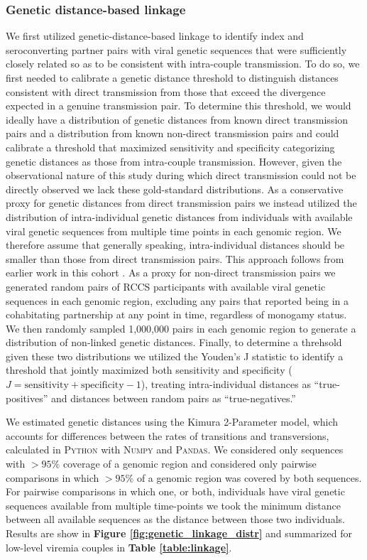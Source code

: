\documentclass{article}[11pt]
\begin{document}
\subsubsection*{Genetic distance-based linkage}
We first utilized genetic-distance-based linkage to identify index and seroconverting partner pairs with viral genetic sequences that were sufficiently closely related so as to be consistent with intra-couple transmission. To do so, we first needed to calibrate a genetic distance threshold to distinguish distances consistent with direct transmission from those that exceed the divergence expected in a genuine transmission pair. To determine this threshold, we would ideally have a distribution of genetic distances from known direct transmission pairs and a distribution from known non-direct transmission pairs and could calibrate a threshold that maximized sensitivity and specificity categorizing genetic distances as those from intra-couple transmission. However, given the observational nature of this study during which direct transmission could not be directly observed we lack these gold-standard distributions. As a conservative proxy for genetic distances from direct transmission pairs we instead utilized the distribution of intra-individual genetic distances from individuals with available viral genetic sequences from multiple time points in each genomic region. We therefore assume that generally speaking, intra-individual distances should be smaller than those from direct transmission pairs. This approach follows from earlier work in this cohort . As a proxy for non-direct transmission pairs we generated random pairs of RCCS participants with available viral genetic sequences in each genomic region, excluding any pairs that reported being in a cohabitating partnership at any point in time, regardless of monogamy status. We then randomly sampled 1,000,000 pairs in each genomic region to generate a distribution of non-linked genetic distances. Finally, to determine a threhsold given these two distributions we utilized the Youden's J statistic to identify a threshold that jointly maximized both sensitivity and specificity ($J = \text{sensitivity}+\text{specificity}-1$), treating intra-individual distances as ``true-positives'' and distances between random pairs as ``true-negatives.''

We estimated genetic distances using the Kimura 2-Parameter model, which accounts for differences between the rates of transitions and transversions, calculated in \textsc{Python} with \textsc{Numpy} and \textsc{Pandas}. We considered only sequences with $>95\%$ coverage of a genomic region and considered only pairwise comparisons in which $>95\%$ of a genomic region was covered by both sequences. For pairwise comparisons in which one, or both, individuals have viral genetic sequences available from multiple time-points we took the minimum distance between all available sequences as the distance between those two individuals. Results are show in \textbf{Figure \ref{fig:genetic_linkage_distr}} and summarized for low-level viremia couples in \textbf{Table \ref{table:linkage}}.
\end{document}
